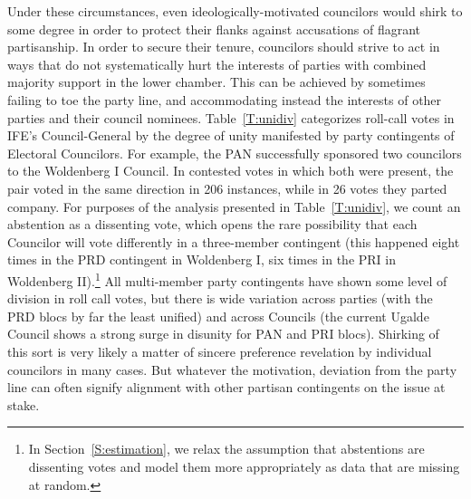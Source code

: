 \documentclass[12 pt, letter]{article}
\begin{document}
Under these circumstances, even ideologically-motivated councilors
would shirk to some degree in order to protect their flanks against
accusations of flagrant partisanship.  In order to secure their
tenure, councilors should strive to act in ways that do not
systematically hurt the interests of parties with combined majority
support in the lower chamber.  This can be achieved by sometimes
failing to toe the party line, and accommodating instead the
interests of other parties and their council nominees.
Table~\ref{T:unidiv} categorizes roll-call votes in IFE's
Council-General by the degree of unity manifested by party
contingents of Electoral Councilors.  For example, the PAN
successfully sponsored two councilors to the Woldenberg I Council.
In contested votes in which both were present, the pair voted in the
same direction in 206 instances, while in 26 votes they parted
company.  For purposes of the analysis presented in
Table~\ref{T:unidiv}, we count an abstention as a dissenting vote,
which opens the rare possibility that each Councilor will vote
differently in a three-member contingent (this happened eight times
in the PRD contingent in Woldenberg I, six times in the PRI in
Woldenberg II).\footnote{In Section~\ref{S:estimation}, we relax the
assumption that abstentions are dissenting votes and model them more
appropriately as data that are missing at random.} All multi-member
party contingents have shown some level of division in roll call
votes, but there is wide variation across parties (with the PRD
blocs by far the least unified) and across Councils (the current
Ugalde Council shows a strong surge in disunity for PAN and PRI
blocs). Shirking of this sort is very likely a matter of sincere
preference revelation by individual councilors in many cases.  But
whatever the motivation, deviation from the party line can often
signify alignment with other partisan contingents on the issue at
stake.
\end{document}
